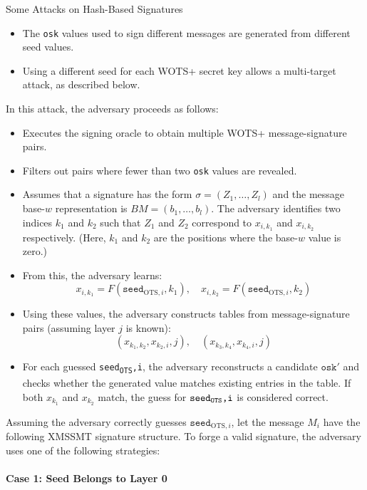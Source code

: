 \documentclass[version=preprint]{iacrcc}
\begin{document}
\begin{section}{Some Attacks on Hash-Based Signatures}
\begin{itemize}
    \item The \texttt{osk} values used to sign different messages are generated from different seed values.
    
    \item Using a different seed for each WOTS+ secret key allows a multi-target attack, as described below.
\end{itemize}

In this attack, the adversary proceeds as follows:

\begin{itemize}
    \item Executes the signing oracle to obtain multiple WOTS+ message-signature pairs.
    \item Filters out pairs where fewer than two \texttt{osk} values are revealed.
    \item Assumes that a signature has the form $\sigma = (Z_1, \ldots, Z_l)$ and the message base-$w$ representation is $BM = (b_1, \ldots, b_l)$. The adversary identifies two indices $k_1$ and $k_2$ such that $Z_1$ and $Z_2$ correspond to $x_{i,k_1}$ and $x_{i,k_2}$ respectively. (Here, $k_1$ and $k_2$ are the positions where the base-$w$ value is zero.)
    
    \item From this, the adversary learns:
    \[
    x_{i,k_1} = F(\texttt{seed}_{\text{OTS},i}, k_1), \quad x_{i,k_2} = F(\texttt{seed}_{\text{OTS},i}, k_2)
    \]
    
    \item Using these values, the adversary constructs tables from message-signature pairs (assuming layer $j$ is known):
    \[
    (x_{k_1,k_2}, x_{k_2,i}, j), \quad (x_{k_3,k_4}, x_{k_4,i}, j)
    \]
    
    \item For each guessed \texttt{seed\textsubscript{OTS},i}, the adversary reconstructs a candidate $\texttt{osk}'$ and checks whether the generated value matches existing entries in the table. If both $x_{k_1}$ and $x_{k_2}$ match, the guess for $\texttt{seed\textsubscript{OTS},i}$ is considered correct.
\end{itemize}

Assuming the adversary correctly guesses $\texttt{seed}_{\text{OTS},i}$, let the message $M_i$ have the following XMSSMT signature structure. To forge a valid signature, the adversary uses one of the following strategies:

\paragraph{Case 1: Seed Belongs to Layer 0}


\end{section}
\end{document}
